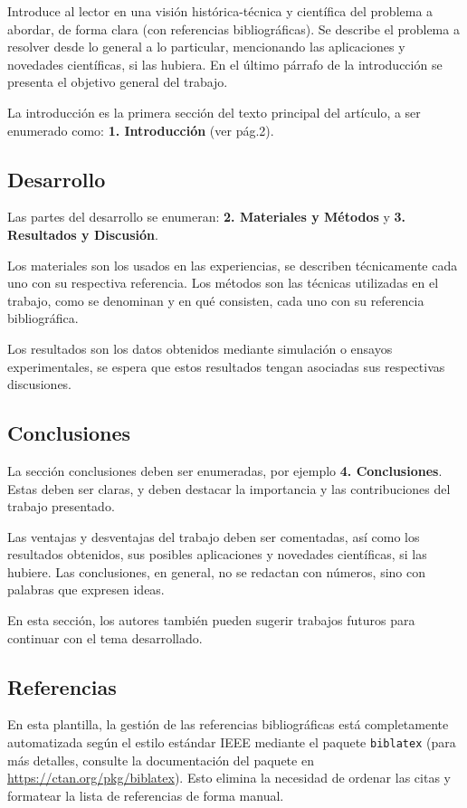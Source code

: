 \documentclass[a4paper, 12pt]{article}
\begin{document}
Introduce al lector en una visión histórica-técnica y científica del problema a
abordar, de forma clara (con referencias bibliográficas). Se describe el
problema a resolver desde lo general a lo particular, mencionando las
aplicaciones y novedades científicas, si las hubiera. En el último párrafo de la
introducción se presenta el objetivo general del trabajo.

La introducción es la primera sección del texto principal del artículo, a ser
enumerado como: \textbf{1. Introducción} (ver pág.2).

\subsection{Desarrollo}

Las partes del desarrollo se enumeran: \textbf{2. Materiales y Métodos} y
\textbf{3. Resultados y Discusión}.

Los materiales son los usados en las experiencias, se describen técnicamente
cada uno con su respectiva referencia. Los métodos son las técnicas utilizadas
en el trabajo, como se denominan y en qué consisten, cada uno con su referencia
bibliográfica.

Los resultados son los datos obtenidos mediante simulación o ensayos
experimentales, se espera que estos resultados tengan asociadas sus respectivas
discusiones.

\subsection{Conclusiones}

La sección conclusiones deben ser enumeradas, por ejemplo \textbf{4.
  Conclusiones}. Estas deben ser claras, y deben destacar la importancia y las
contribuciones del trabajo presentado.

Las ventajas y desventajas del trabajo deben ser comentadas, así como los
resultados obtenidos, sus posibles aplicaciones y novedades científicas, si las
hubiere. Las conclusiones, en general, no se redactan con números, sino con
palabras que expresen ideas.

En esta sección, los autores también pueden sugerir trabajos futuros para
continuar con el tema desarrollado.

\subsection{Referencias}

En esta plantilla, la gestión de las referencias bibliográficas está completamente automatizada según el estilo estándar IEEE mediante el paquete \texttt{biblatex} (para más detalles, consulte la documentación del paquete en \url{https://ctan.org/pkg/biblatex}). Esto elimina la necesidad de ordenar las citas y formatear la lista de referencias de forma manual.
\end{document}
